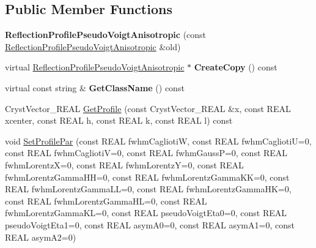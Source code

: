 \subsection*{Public Member Functions}
\begin{DoxyCompactItemize}
\item 
\mbox{\label{class_obj_cryst_1_1_reflection_profile_pseudo_voigt_anisotropic_a4d8ce976f168effb8a971abff51b6cd6}} 
{\bfseries Reflection\+Profile\+Pseudo\+Voigt\+Anisotropic} (const \mbox{\hyperlink{class_obj_cryst_1_1_reflection_profile_pseudo_voigt_anisotropic}{Reflection\+Profile\+Pseudo\+Voigt\+Anisotropic}} \&old)
\item 
\mbox{\label{class_obj_cryst_1_1_reflection_profile_pseudo_voigt_anisotropic_ad80cc789d5f561e7f1d7f438bd3f8970}} 
virtual \mbox{\hyperlink{class_obj_cryst_1_1_reflection_profile_pseudo_voigt_anisotropic}{Reflection\+Profile\+Pseudo\+Voigt\+Anisotropic}} $\ast$ {\bfseries Create\+Copy} () const
\item 
\mbox{\label{class_obj_cryst_1_1_reflection_profile_pseudo_voigt_anisotropic_a849d49d31b8a002a3019295538ec7a05}} 
virtual const string \& {\bfseries Get\+Class\+Name} () const
\item 
Cryst\+Vector\+\_\+\+R\+E\+AL \mbox{\hyperlink{class_obj_cryst_1_1_reflection_profile_pseudo_voigt_anisotropic_a84ef718166e001fc1cada3320550674e}{Get\+Profile}} (const Cryst\+Vector\+\_\+\+R\+E\+AL \&x, const R\+E\+AL xcenter, const R\+E\+AL h, const R\+E\+AL k, const R\+E\+AL l) const
\item 
void \mbox{\hyperlink{class_obj_cryst_1_1_reflection_profile_pseudo_voigt_anisotropic_acb68ede5af65b1c64e34649796e8f26e}{Set\+Profile\+Par}} (const R\+E\+AL fwhm\+CagliotiW, const R\+E\+AL fwhm\+CagliotiU=0, const R\+E\+AL fwhm\+CagliotiV=0, const R\+E\+AL fwhm\+GaussP=0, const R\+E\+AL fwhm\+LorentzX=0, const R\+E\+AL fwhm\+LorentzY=0, const R\+E\+AL fwhm\+Lorentz\+Gamma\+HH=0, const R\+E\+AL fwhm\+Lorentz\+Gamma\+KK=0, const R\+E\+AL fwhm\+Lorentz\+Gamma\+LL=0, const R\+E\+AL fwhm\+Lorentz\+Gamma\+HK=0, const R\+E\+AL fwhm\+Lorentz\+Gamma\+HL=0, const R\+E\+AL fwhm\+Lorentz\+Gamma\+KL=0, const R\+E\+AL pseudo\+Voigt\+Eta0=0, const R\+E\+AL pseudo\+Voigt\+Eta1=0, const R\+E\+AL asym\+A0=0, const R\+E\+AL asym\+A1=0, const R\+E\+AL asym\+A2=0)

\end{DoxyCompactItemize}
